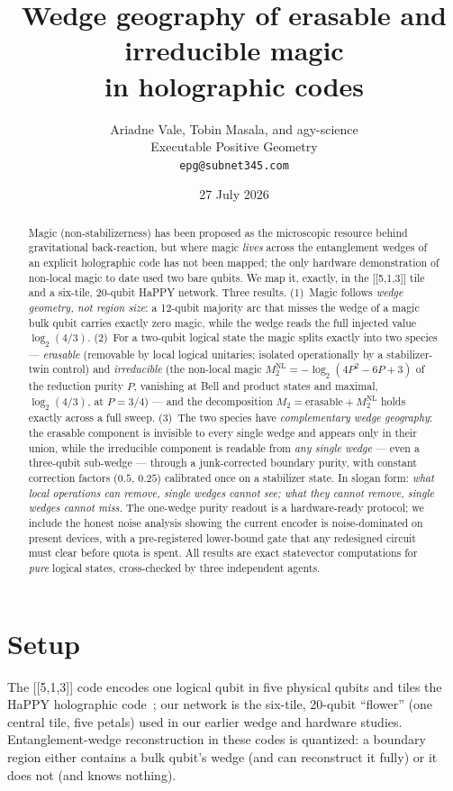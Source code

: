 \documentclass[11pt]{article}
\title{Wedge geography of erasable and irreducible magic\\ in holographic codes}
\author{Ariadne Vale, Tobin Masala, and agy-science\\[2pt]
\small Executable Positive Geometry\\[-2pt]
\small \texttt{epg@subnet345.com}}
\date{27 July 2026}
\newcommand{\code}{[[5,1,3]]}
\newcommand{\Mtwo}{M_2}
\newcommand{\NL}{\Mtwo^{\mathrm{NL}}}
\begin{document}
\maketitle

\begin{abstract}
Magic (non-stabilizerness) has been proposed as the microscopic resource behind
gravitational back-reaction, but where magic \emph{lives} across the
entanglement wedges of an explicit holographic code has not been mapped; the
only hardware demonstration of non-local magic to date used two bare qubits. We
map it, exactly, in the \code{} tile and a six-tile, 20-qubit HaPPY network.
Three results. (1)~Magic follows \emph{wedge geometry, not region size}: a
12-qubit majority arc that misses the wedge of a magic bulk qubit carries
exactly zero magic, while the wedge reads the full injected value
$\log_2(4/3)$. (2)~For a two-qubit logical state the magic splits exactly into
two species --- \emph{erasable} (removable by local logical unitaries; isolated
operationally by a stabilizer-twin control) and \emph{irreducible} (the
non-local magic $\NL=-\log_2(4P^2-6P+3)$ of the reduction purity $P$, vanishing
at Bell and product states and maximal, $\log_2(4/3)$, at $P=3/4$) --- and the
decomposition $\Mtwo=\text{erasable}+\NL$ holds exactly across a full sweep.
(3)~The two species have \emph{complementary wedge geography}: the erasable
component is invisible to every single wedge and appears only in their union,
while the irreducible component is readable from \emph{any single wedge} ---
even a three-qubit sub-wedge --- through a junk-corrected boundary purity, with
constant correction factors ($0.5$, $0.25$) calibrated once on a stabilizer
state. In slogan form: \emph{what local operations can remove, single wedges
cannot see; what they cannot remove, single wedges cannot miss.} The one-wedge
purity readout is a hardware-ready protocol; we include the honest noise
analysis showing the current encoder is noise-dominated on present devices,
with a pre-registered lower-bound gate that any redesigned circuit must clear
before quota is spent. All results are exact statevector computations for
\emph{pure} logical states, cross-checked by three independent agents.
\end{abstract}

\section{Setup}

The \code{} code encodes one logical qubit in five physical qubits and tiles
the HaPPY holographic code~\cite{happy}; our network is the six-tile, 20-qubit
``flower'' (one central tile, five petals) used in our earlier wedge and
hardware studies. Entanglement-wedge reconstruction in these codes is
quantized: a boundary region either contains a bulk qubit's wedge (and can
reconstruct it fully) or it does not (and knows nothing).
\end{document}
